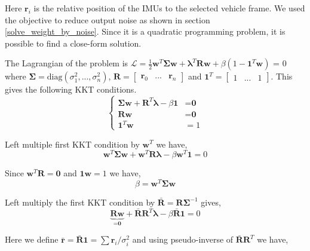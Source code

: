 \documentclass[conference]{IEEEtran}
\begin{document}
Here $\textbf{r}_i$ is the relative position of the IMUs to the selected vehicle frame. We used the objective to reduce output noise as shown in section \ref{solve_weight_by_noise}. Since it is a quadratic programming problem, it is possible to find a close-form solution.

The Lagrangian of the problem is $\mathcal{L} = \frac{1}{2}\textbf{w}^T \bm{\Sigma} \textbf{w} + \bm{\lambda}^T \textbf{R}\textbf{w} + \beta \left( 1 - \textbf{1}^T \textbf{w} \right)$ = 0 where $\bm{\Sigma} = \text{diag}(\sigma_1^2, ..., \sigma_n^2)$, $\textbf{R} = \left[\begin{matrix} \textbf{r}_0 & ... & \textbf{r}_n\end{matrix}\right]$ and $\textbf{1}^T = \left[\begin{matrix}1 & ... & 1\end{matrix}\right]$. This gives the following KKT conditions.
\begin{equation}
\begin{cases}
  \bm{\Sigma}\textbf{w} + \textbf{R}^T \bm{\lambda} - \beta \textbf{1} &= \textbf{0} \\
  \textbf{R} \textbf{w} &= \textbf{0} \\
  \textbf{1}^T \textbf{w} &= 1
\end{cases}
\end{equation}

Left multiple first KKT condition by $\textbf{w}^T$ we have,
\begin{equation}
\textbf{w}^T\bm{\Sigma}\textbf{w} + \textbf{w}^T\textbf{R}\bm{\lambda} - \beta \textbf{w}^T\textbf{1} = 0
\end{equation}

Since $\textbf{w}^T\textbf{R} = \textbf{0}$ and $\textbf{1}\textbf{w} = 1$ we have,
\begin{equation}\label{beta}
    \beta = \textbf{w}^T\bm{\Sigma}\textbf{w}
\end{equation}

Left multiply the first KKT condition by $\bar{\textbf{R}} = \textbf{R}\bm{\Sigma}^{-1}$ gives,
\begin{equation}
\underbrace{\textbf{R}\textbf{w}}_{=\textbf{0}} + \bar{\textbf{R}}\textbf{R}^T\bm{\lambda} - \beta\bar{\textbf{R}}\textbf{1} = 0
\end{equation}

Here we define $\bar{\textbf{r}} = \bar{\textbf{R}}\textbf{1} = \sum{\textbf{r}_i / \sigma_i^2}$ and using pseudo-inverse of $\bar{\textbf{R}}\textbf{R}^T$ we have,
\end{document}
